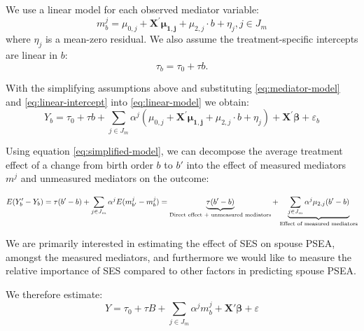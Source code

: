 \documentclass[
  12pt,
]{article}
\theoremstyle{definition}
\theoremstyle{definition}
\theoremstyle{definition}
\theoremstyle{definition}
\theoremstyle{remark}
\begin{document}
We use a linear model for each observed mediator variable:
\begin{equation}
\label{eq:mediator-model}
m^j_b=\mu_{0,j}+\mathbf{X^\prime}\symbf{\mu_{1,j}}+\mu_{2,j}\cdot b+\eta_j, j \in J_m  
\end{equation}
where \(\eta_j\) is a mean-zero residual. We also assume the treatment-specific
intercepts are linear in \(b\):
\begin{equation}
\label{eq:linear-intercept}
\tau_b=\tau_{0}+\tau b.  
\end{equation}

With the simplifying assumptions above and substituting \eqref{eq:mediator-model}
and \eqref{eq:linear-intercept} into \eqref{eq:linear-model} we obtain:
\begin{equation}
\label{eq:simplified-model}
Y_b = \tau_0+\tau b + \sum_{j \in J_m} \alpha^j (\mu_{0,j}+\mathbf{X^\prime}\symbf{\mu_{1,j}}+\mu_{2,j}\cdot b+\eta_j) + \mathbf{X^\prime} \symbf{\beta} + \varepsilon_b 
\end{equation}

Using equation \eqref{eq:simplified-model}, we can decompose the average treatment
effect of a change from birth order \(b\) to \(b'\) into the effect of measured mediators
\(m^j\) and unmeasured mediators on the outcome:

\begin{equation}
\label{eq:decomposition}
E(Y_b' - Y_b) = \tau(b' - b) + \sum_{j \in J_m} \alpha^j E(m^j_{b'} - m^j_b) \\
=\underbrace{\tau(b' - b)}_{\text{Direct effect + unmeasured mediators}} + \underbrace{\sum_{j \in J_m} \alpha^j \mu_{2,j} (b' - b)}_{\text{Effect of measured mediators}}
\end{equation}

We are primarily interested in estimating the effect of SES on spouse PSEA,
amongst the measured mediators, and furthermore we would like to measure the
relative importance of SES compared to other factors in predicting spouse PSEA.

We therefore estimate:
\begin{equation}
\label{eq:model-to-estimate}
Y = \tau_0 + \tau B + \sum_{j \in J_m} \alpha^j m^j_b + \mathbf{X'} \symbf{\beta} + \varepsilon
\end{equation}
\end{document}
